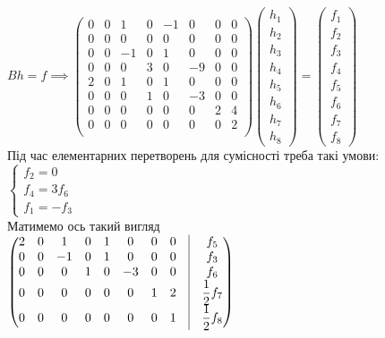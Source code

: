 \documentclass[a4paper, 10pt]{article}
\theoremstyle{theoremdd}
\theoremstyle{theoremdd}
\theoremstyle{theoremdd}
\theoremstyle{theoremdd}
\theoremstyle{theoremdd}
\theoremstyle{theoremdd}
\theoremstyle{theoremdd}
\theoremstyle{theoremdd}
\begin{document}
$Bh = f \implies \begin{pmatrix}
0 & 0 & 1 & 0 & -1 & 0 & 0 & 0 \\
0 & 0 & 0 & 0 & 0 & 0 & 0 & 0 \\
0 & 0 & -1 & 0 & 1 & 0 & 0 & 0 \\
0 & 0 & 0 & 3 & 0 & -9 & 0 & 0 \\
2 & 0 & 1 & 0 & 1 & 0 & 0 & 0 \\
0 & 0 & 0 & 1 & 0 & -3 & 0 & 0 \\
0 & 0 & 0 & 0 & 0 & 0 & 2 & 4 \\
0 & 0 & 0 & 0 & 0 & 0 & 0 & 2 \\
\end{pmatrix} \begin{pmatrix}
h_1 \\ h_2 \\ h_3 \\ h_4 \\ h_5 \\ h_6 \\ h_7 \\ h_8
\end{pmatrix} = \begin{pmatrix}
f_1 \\ f_2 \\ f_3 \\ f_4 \\ f_5 \\ f_6 \\ f_7 \\ f_8
\end{pmatrix}$\\
Під час елементарних перетворень для сумісності треба такі умови:\\
$\begin{cases}
f_2 = 0 \\
f_4 = 3f_6 \\
f_1 = -f_3
\end{cases}$\\
Матимемо ось такий вигляд\\
$\begin{pmatrix}
2 & 0 & 1 & 0 & 1 & 0 & 0 & 0 & \vline & f_5 \\
0 & 0 & -1 & 0 & 1 & 0 & 0 & 0 & \vline & f_3 \\
0 & 0 & 0 & 1 & 0 & -3 & 0 & 0 & \vline & f_6 \\
0 & 0 & 0 & 0 & 0 & 0 & 1 & 2 & \vline & \dfrac{1}{2}f_7 \\
0 & 0 & 0 & 0 & 0 & 0 & 0 & 1 & \vline & \dfrac{1}{2}f_8 \\
\end{pmatrix}$\\
\end{document}
